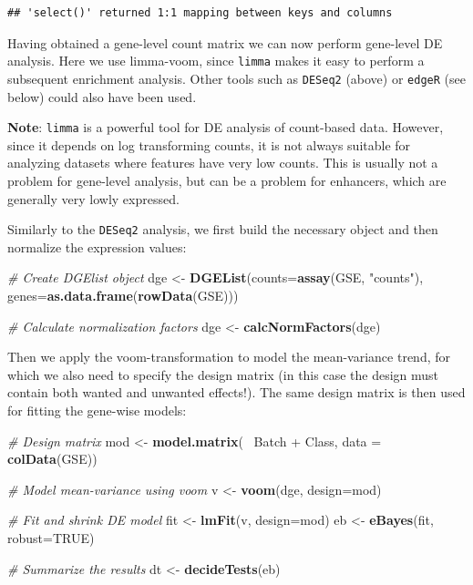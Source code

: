 \documentclass[9pt,a4paper,]{extarticle}
\newenvironment{Shaded}{\begin{snugshade}}{\end{snugshade}}
\newcommand{\KeywordTok}[1]{\textcolor[rgb]{0.13,0.29,0.53}{\textbf{{#1}}}}
\newcommand{\DataTypeTok}[1]{\textcolor[rgb]{0.13,0.29,0.53}{{#1}}}
\newcommand{\StringTok}[1]{\textcolor[rgb]{0.31,0.60,0.02}{{#1}}}
\newcommand{\CommentTok}[1]{\textcolor[rgb]{0.56,0.35,0.01}{\textit{{#1}}}}
\newcommand{\OtherTok}[1]{\textcolor[rgb]{0.56,0.35,0.01}{{#1}}}
\newcommand{\NormalTok}[1]{{#1}}
\begin{document}
\begin{verbatim}
## 'select()' returned 1:1 mapping between keys and columns
\end{verbatim}

Having obtained a gene-level count matrix we can now perform gene-level DE analysis. Here we use limma-voom, since \texttt{limma} makes it easy to perform a subsequent enrichment analysis. Other tools such as \texttt{DESeq2} (above) or \texttt{edgeR} (see below) could also have been used.

\textbf{Note}: \texttt{limma} is a powerful tool for DE analysis of count-based data. However, since it depends on log transforming counts, it is not always suitable for analyzing datasets where features have very low counts. This is usually not a problem for gene-level analysis, but can be a problem for enhancers, which are generally very lowly expressed.

Similarly to the \texttt{DESeq2} analysis, we first build the necessary object and then normalize the expression values:

\begin{Shaded}
\begin{Highlighting}[]
\CommentTok{# Create DGElist object}
\NormalTok{dge <-}\StringTok{ }\KeywordTok{DGEList}\NormalTok{(}\DataTypeTok{counts=}\KeywordTok{assay}\NormalTok{(GSE, }\StringTok{"counts"}\NormalTok{),}
               \DataTypeTok{genes=}\KeywordTok{as.data.frame}\NormalTok{(}\KeywordTok{rowData}\NormalTok{(GSE)))}

\CommentTok{# Calculate normalization factors}
\NormalTok{dge <-}\StringTok{ }\KeywordTok{calcNormFactors}\NormalTok{(dge)}
\end{Highlighting}
\end{Shaded}

Then we apply the voom-transformation to model the mean-variance trend, for which we also need to specify the design matrix (in this case the design must contain both wanted and unwanted effects!). The same design matrix is then used for fitting the gene-wise models:

\begin{Shaded}
\begin{Highlighting}[]
\CommentTok{# Design matrix}
\NormalTok{mod <-}\StringTok{ }\KeywordTok{model.matrix}\NormalTok{(~}\StringTok{ }\NormalTok{Batch +}\StringTok{ }\NormalTok{Class, }\DataTypeTok{data =} \KeywordTok{colData}\NormalTok{(GSE))}

\CommentTok{# Model mean-variance using voom}
\NormalTok{v <-}\StringTok{ }\KeywordTok{voom}\NormalTok{(dge, }\DataTypeTok{design=}\NormalTok{mod)}

\CommentTok{# Fit and shrink DE model}
\NormalTok{fit <-}\StringTok{ }\KeywordTok{lmFit}\NormalTok{(v, }\DataTypeTok{design=}\NormalTok{mod)}
\NormalTok{eb <-}\StringTok{ }\KeywordTok{eBayes}\NormalTok{(fit, }\DataTypeTok{robust=}\OtherTok{TRUE}\NormalTok{)}

\CommentTok{# Summarize the results}
\NormalTok{dt <-}\StringTok{ }\KeywordTok{decideTests}\NormalTok{(eb)}
\end{Highlighting}
\end{Shaded}
\end{document}
